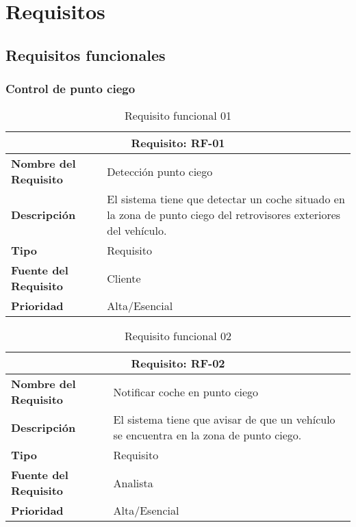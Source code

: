 \documentclass[10pt,a4paper,oldfontcommands]{dpds}
\begin{document}
\pagecolor{fondo}
\color{principal}


\section{Requisitos}
\subsection{Requisitos funcionales}


\subsubsection{Control de punto ciego}

\begin{table}[H]
\begin{center}
\begin{tabular}{p{} p{7cm}}
\multicolumn{2}{c}{\textbf{Requisito: RF-01} } \\
\hline \hline
\textbf{Nombre del Requisito} & Detección punto ciego  \\
\hline
\textbf{Descripción} & El sistema tiene que detectar un coche situado en la zona de punto ciego del retrovisores exteriores del vehículo.  \\
\hline
\textbf{Tipo} & Requisito  \\
\hline
\textbf{Fuente del Requisito} & Cliente  \\
\hline
\textbf{Prioridad} & Alta/Esencial  \\ \hline
\end{tabular}
\caption{Requisito funcional 01}
\label{tab:personal}
\end{center}
\end{table}

\begin{table}[H]
\begin{center}
\begin{tabular}{p{} p{7cm}}
\multicolumn{2}{c}{\textbf{Requisito: RF-02} } \\
\hline \hline
\textbf{Nombre del Requisito} & Notificar coche en punto ciego  \\
\hline
\textbf{Descripción} & El sistema tiene que avisar de que un vehículo se encuentra en la zona de punto ciego. \\
\hline
\textbf{Tipo} & Requisito  \\
\hline
\textbf{Fuente del Requisito} & Analista  \\
\hline
\textbf{Prioridad} & Alta/Esencial  \\ \hline
\end{tabular}
\caption{Requisito funcional 02}
\label{tab:personal}
\end{center}
\end{table}
\end{document}
